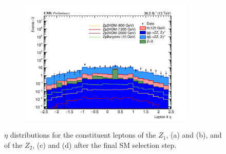 \begin{figure}[tbh]
\begin{subfigure}{0.50\textwidth}
\caption{}
\end{subfigure}
\begin{subfigure}{0.50\textwidth}
\centering
\includegraphics[width=3.3in]{figures/hist_hlept4_eta_CR.png}
\caption{}
\end{subfigure}
\caption{$\eta$ distributions for the constituent leptons of the $Z_1$, (a) and (b), and of the $Z_2$, (c) and (d) after the final SM selection step.}
\label{fig:leptkinsm2}
\end{figure}

